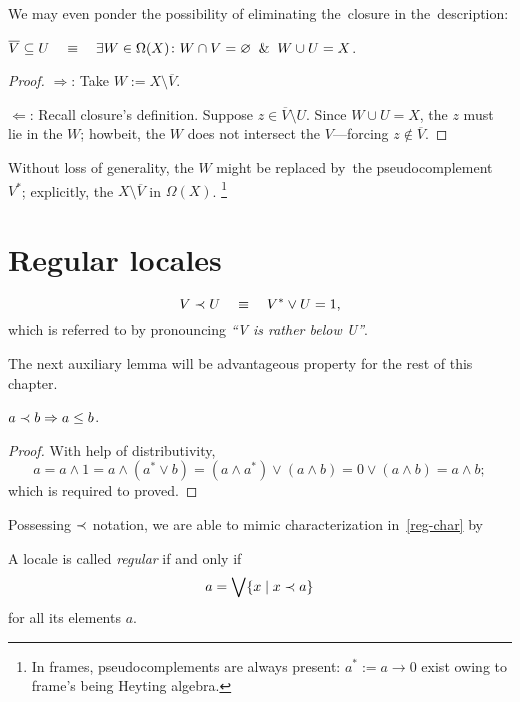 We may even ponder the possibility of eliminating the~closure in
the~description:

\begin{lem}
  $\overline{V}\subseteq U \quad \equiv \quad \exists W\in \Omega(X)\colon W \cap V =
  \varnothing \;\; \& \;\; W \cup U = X$.
\end{lem}
\begin{proof}
  $\Rightarrow$:
  Take $W := X\setminus \overline{V}$.

  $\Leftarrow$:
  Recall closure's definition.
  Suppose $z\in \overline{V}\setminus U$.
  Since $W \cup U = X$, the $z$ must lie in the $W$;
  howbeit, the $W$ does not intersect the $V$---forcing $z\not\in
  \overline{V}$.
\end{proof}

Without loss of generality, the $W$ might be replaced by~the
pseudocomplement~$V^*$;
explicitly, the $X\setminus \overline{V}$ in $\Omega(X)$.%
\footnote{In frames, pseudocomplements are always present: $a^* := a
\rightarrow 0$ exist owing to frame's being Heyting algebra.}

\section{Regular locales}

\begin{framed}
  \begin{nota}[$\rb$]
    \[
      V \prec U \quad \equiv \quad V^* \vee U = 1,
    \]
    which is referred to by pronouncing \emph{``V is rather below U''\/}.
  \end{nota}
\end{framed}

The next auxiliary lemma will be advantageous property for the rest of this
chapter.
\begin{lem} \label{rb->leq}
  $a \prec b \Rightarrow a \leq b$.
\end{lem}
\begin{proof}
  With help of distributivity,
  \[
    a = a \wedge 1 = a \wedge (a^* \vee b) = (a \wedge a^*) \vee (a \wedge b) =
    0 \vee (a \wedge b) = a \wedge b;
  \]
  which is required to proved.
\end{proof}

Possessing $\rb$ notation, we are able to mimic characterization
in~\ref{reg-char} by
\begin{framed}
  \begin{df}[Reg]
    A locale is called \emph{regular\/} if and only if
    \[
      a = \bigvee \{x \mid x \prec a\}
    \]
    for all its elements $a$.
  \end{df}
\end{framed}

